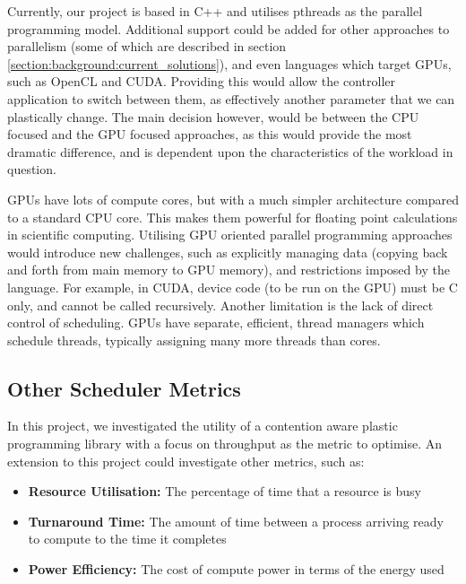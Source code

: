 Currently, our project is based in C++ and utilises pthreads as the parallel programming model. Additional support could be added for other approaches to parallelism (some of which are described in section \ref{section:background:current_solutions}), and even languages which target GPUs, such as OpenCL and CUDA. Providing this would allow the controller application to switch between them, as effectively another parameter that we can plastically change. The main decision however, would be between the CPU focused and the GPU focused approaches, as this would provide the most dramatic difference, and is dependent upon the characteristics of the workload in question.

GPUs have lots of compute cores, but with a much simpler architecture compared to a standard CPU core. This makes them powerful for floating point calculations in scientific computing. Utilising GPU oriented parallel programming approaches would introduce new challenges, such as explicitly managing data (copying back and forth from main memory to GPU memory), and restrictions imposed by the language. For example, in CUDA, device code (to be run on the GPU) must be C only, and cannot be called recursively. Another limitation is the lack of direct control of scheduling. GPUs have separate, efficient, thread managers which schedule threads, typically assigning many more threads than cores.



\subsection{Other Scheduler Metrics}
\label{section:conclusion_and_future_work:other_scheduler_metrics}

In this project, we investigated the utility of a contention aware plastic programming library with a focus on throughput as the metric to optimise. An extension to this project could investigate other metrics, such as:

\begin{itemize}
    \item \textbf{Resource Utilisation:} The percentage of time that a resource is busy
    \item \textbf{Turnaround Time:}      The amount of time between a process arriving ready to compute to the time it completes
    \item \textbf{Power Efficiency:}     The cost of compute power in terms of the energy used
\end{itemize}



